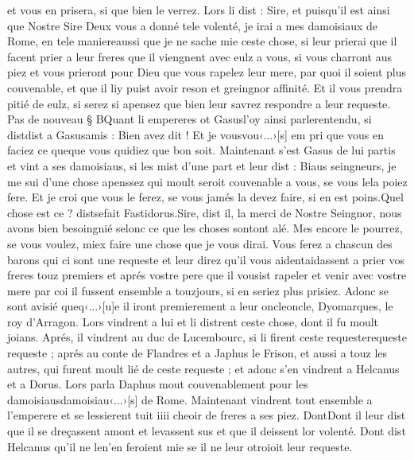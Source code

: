 \documentclass{article}
\begin{document}
\begin{pages}
      et vous en prisera, si que bien le verrez.
   Lors li dist :
   Sire, et puisqu’il est ainsi que Nostre Sire Deux vous a donné tele volenté, je irai a mes damoisiaux de 
      Rome, en tele maniereaussi 
      que je ne sache mie ceste chose, si leur prierai que il facent prier a leur freres que il viengnent avec eulz a vous, 
   si vous charront aus piez et vous prieront pour Dieu que vous rapelez leur mere, 
      par quoi il soient plus couvenable, et que il liy puist avoir reson 
      et greingnor affinité. Et il vous prendra pitié de eulz, si serez si apensez que bien leur savrez respondre a leur requeste. \pend
\pstart Pas de nouveau § BQuant li empereres 
   ot Gasusl'oy 
   ainsi parlerentendu, si 
   distdist a 
   Gasusamis : 
   Bien avez dit ! Et je vousvou‹...›[s] 
      em 
      pri que vous en faciez ce queque vous quidiez que bon soit.
   Maintenant s’est Gasus de lui partis et vint a ses damoisiaus, 
   si les mist d’une part et leur dist :
   Biaus seingneurs, je me sui d’une chose apenssez qui moult seroit couvenable a vous, 
      se vous lela poiez fere. Et je croi que vous le ferez, se vous jamés la devez 
      faire, si en est poins.Quel chose est ce ? 
      distsefait 
      Fastidorus.Sire, dist il, la merci de Nostre Seingnor, nous avons bien besoingnié selonc ce que les choses 
      sontont alé. Mes encore 
      le pourrez, se vous voulez, miex faire une chose 
      que je vous dirai. Vous ferez a chascun des barons qui ci sont une requeste et leur direz qu’il vous 
         aidentaidassent a prier vos freres touz premiers et aprés 
         vostre pere que il vousist rapeler et venir avec vostre mere
         par coi il fussent ensemble a touzjours, si en seriez plus prisiez.
   Adonc se sont avisié queq‹...›[u]e il iront premierement a 
   leur oncleoncle, Dyomarques, 
      le roy d’Arragon. \pend
\pstart Lors vindrent a lui et li distrent ceste chose, dont il fu moult joians. 
   Aprés, il vindrent au 
   duc de Lucembourc, 
   si li firent ceste requesterequeste requeste ; aprés au 
   conte de Flandres 
   et a Japhus le Frison, et aussi a touz les autres, 
   qui furent moult lié de ceste requeste ; et adonc s’en vindrent a Helcanus et 
   a Dorus. Lors parla Daphus mout couvenablement pour 
   les damoisiausdamoisiau‹...›[s] de Rome. 
   Maintenant vindrent tout ensemble a l’emperere et se lessierent tuit iiii cheoir 
   de freres a ses piez. 
   DontDont il leur dist que 
   il se dreçassent amont et 
      levassent sus et 
      que il deissent lor volenté. 
   Dont dist Helcanus qu’il 
      ne len'en feroient mie se il ne leur otroioit leur requeste.

\end{pages}
\end{document}
